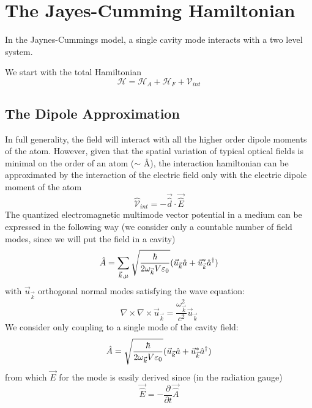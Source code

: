 \section{The Jayes-Cumming Hamiltonian}
In the Jaynes-Cummings model, a single cavity mode interacts with a two level system. 

We start with the total Hamiltonian
\begin{equation}
	\mathscr{H} = \mathscr{H}_A + \mathscr{H}_F +\mathscr{V}_{int}
\end{equation}
\subsection{The Dipole Approximation}
In full generality, the field will interact with all the higher order dipole moments of the atom.
However, given that the spatial variation of typical optical fields is minimal on the order of an atom ($\sim$ \AA), the interaction hamiltonian can be approximated by the interaction of the electric field only with the electric dipole moment of the atom
\begin{equation}
	\hat{\mathscr{V}}_{int} = -\vec{\hat{d}} \cdot \vec{\hat{E}}
\end{equation}
The quantized electromagnetic multimode vector potential in a medium can be expressed in the following way \cite[271--273]{Novotny2006}(we consider only a countable number of field modes, since we will put the field in a cavity)
\begin{equation}
	\hat{A} = \sum_{\vec{k}, \mu} \sqrt{\frac{\hbar}{2\omega_{\vec{k}} V \varepsilon_0}} (\vec{u}_{\vec{k}} \hat{a} + \vec{u}^*_{\vec{k}} {\hat{a}^\dagger} )
\end{equation}
with $\vec{u}_{\vec{k}}$ orthogonal normal modes satisfying the wave equation:
\begin{equation}
	\nabla \times \nabla \times \vec{u}_{\vec{k}} = \frac{\omega_{\vec{k}}^2}{c^2}  \vec{u}_{\vec{k}}
\end{equation}
We consider only coupling to a single mode of the cavity field:
\begin{equation}
	\hat{A} =  \sqrt{\frac{\hbar}{2\omega_{\vec{k}} V \varepsilon_0}} (\vec{u}_{\vec{k}} \hat{a} + \vec{u}^*_{\vec{k}} {\hat{a}^\dagger} )
\end{equation}
from which $\vec{E}$ for the mode is easily derived since (in the radiation gauge)
\begin{equation}
	\vec{\hat{E}} = -\frac{\partial}{\partial t}\vec{\hat{A}}
\end{equation}
